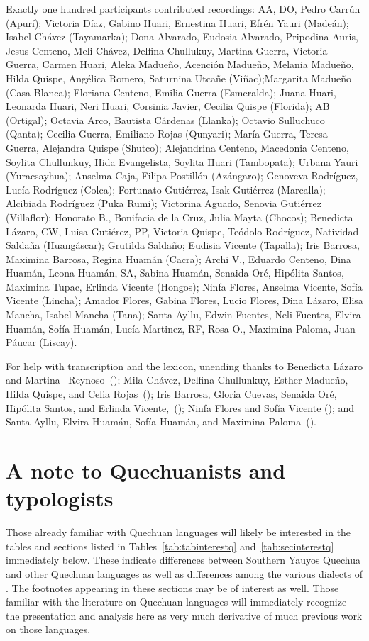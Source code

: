 Exactly one hundred participants contributed recordings: AA, DO, Pedro Carrún (Apurí);
Victoria Díaz, Gabino Huari, Ernestina Huari, Efrén Yauri (Madeán);
Isabel Chávez (Tayamarka);
Dona Alvarado, Eudosia Alvarado, Pripodina Auris, Jesus Centeno, Meli Chávez, Delfina Chullukuy, Martina Guerra, Victoria Guerra, Carmen Huari, Aleka Madueño, Acención Madueño, Melania Madueño, Hilda Quispe, Angélica Romero, Saturnina Utcañe (Viñac);Margarita Madueño (Casa Blanca); Floriana Centeno, Emilia Guerra (Esmeralda); Juana Huari, Leonarda Huari, Neri Huari, Corsinia Javier, Cecilia Quispe (Florida); AB (Ortigal); Octavia Arco, Bautista Cárdenas (Llanka); Octavio Sulluchuco (Qanta); Cecilia Guerra, Emiliano Rojas (Qunyari); María Guerra, Teresa Guerra, Alejandra Quispe (Shut\-co); Alejandrina Centeno, Macedonia Centeno, Soylita Chullunkuy, Hida Evangelista, Soylita Huari (Tambopata); Urbana Yauri (Yuracsayhua); Anselma Caja, Filipa Postillón (Azángaro); Genoveva Rodríguez, Lucía Rodríguez (Colca); Fortunato Gutiérrez, Isak Gutiérrez (Marcalla); Alcibiada Rodríguez (Puka Rumi); Victorina Aguado, Senovia Gutiérrez (Villaflor); Honorato B., Bonifacia de la Cruz, Julia Mayta (Chocos); Benedicta Lázaro, CW,  Luisa Gutiérez, PP, Victoria Quispe, Teódolo Rodríguez, Natividad Saldaña (Huangáscar); Grutilda Saldaño; Eudisia Vicente (Tapalla); Iris Barrosa, Maximina Barrosa, Regina Huamán (Cacra); Archi V., Eduardo Centeno, Dina Huamán, Leona Huamán, SA, Sabina Huamán, Senaida Oré, Hipólita Santos, Maximina Tupac, Erlinda Vicente (Hongos); Ninfa Flores, Anselma Vicente, Sofía Vicente (Lincha); Amador Flores, Ga\-bi\-na Flores, Lucio Flores, Dina Lázaro, Elisa Mancha, Isabel Mancha (Tana); Santa Ayllu, Edwin Fuentes, Neli Fuentes, Elvira Huamán, Sofía Huamán, Lucía Martinez, RF, Rosa O., Maximina Paloma, Juan Páucar (Liscay).

\newpage 
For help with transcription and the lexicon, unending thanks to \foreignlanguage{spanish}{Benedicta Lázaro} and Martina \ Reynoso~(\ACH); Mila Chávez, Delfina Chullunkuy, \foreignlanguage{spanish}{Esther Madueño}, Hilda Quispe, and Celia Rojas~(\AMV); Iris Barrosa, Gloria Cuevas, Senaida Oré, Hipólita Santos, and Erlinda Vicente,~(\CH); Ninfa Flores and Sofía Vicente (\LT); and Santa Ayllu, Elvira Huamán, Sofía Huamán, and Maximina Paloma~(\SP).

\section{A note to Quechuanists and typologists}\label{sec:notetoquechuanists} 
Those already familiar with Quechuan languages will likely be interested in the tables and sections listed in Tables~\ref{tab:tabinterestq} and~\ref{tab:secinterestq} immediately below. These indicate differences between Southern Yauyos Quechua and other Quechuan languages as well as differences among the various dialects of \SYQ. The footnotes appearing in these sections may be of interest as well. Those familiar with the literature on Quechuan languages will immediately recognize the presentation and analysis here as very much derivative of much previous work on those languages.\\

